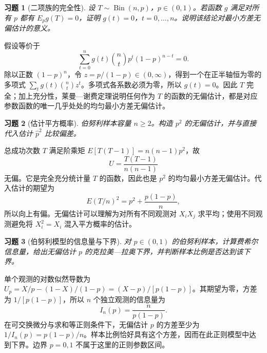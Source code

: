 \documentclass[UTF8,12pt,a4paper,fontset=fandol]{ctexart}
\newtheorem{exercise}{习题}[section]
\begin{document}
\begin{exercise}[二项族的完全性]\label{q:B11.4}
设 $T\sim\operatorname{Bin}(n,p)$，$p\in(0,1)$。若函数 $g$ 满足对所有 $p$ 都有 $E_pg(T)=0$，证明 $g(t)=0$，$t=0,\ldots,n$。说明该结论对最小方差无偏估计的意义。\par{}
\end{exercise}

\begin{solve}\label{a:B11.4}假设等价于\[\sum_{t=0}^ng(t)\binom nt p^t(1-p)^{n-t}=0.\]除以正数 $(1-p)^n$，令 $z=p/(1-p)\in(0,\infty)$，得到一个在正半轴恒为零的多项式 $\sum_tg(t)\binom ntz^t$。多项式各系数必须为零，所以 $g(t)=0$。因此 $T$ 完全；加上充分性，莱曼—谢费定理说明任何作为 $T$ 的函数的无偏估计，都是对应参数函数的唯一几乎处处的均匀最小方差无偏估计。\end{solve}

\begin{exercise}[估计平方概率]\label{q:B11.5}
伯努利样本容量 $n\ge2$。构造 $p^2$ 的无偏估计，并与直接代入估计 $\widehat p^2$ 比较偏差。\par{}
\end{exercise}

\begin{solve}\label{a:B11.5}总成功次数 $T$ 满足阶乘矩 $E[T(T-1)]=n(n-1)p^2$，故\[U=\frac{T(T-1)}{n(n-1)}\]无偏。它是完全充分统计量 $T$ 的函数，因此也是 $p^2$ 的均匀最小方差无偏估计。代入估计的期望为\[E(T/n)^2=p^2+\frac{p(1-p)}n,\]所以向上有偏。无偏估计可以理解为对所有不同观测对 $X_iX_j$ 求平均；使用不同观测避免将 $X_i^2=X_i$ 混入平方概率的估计。\end{solve}

\begin{exercise}[伯努利模型的信息量与下界]\label{q:B11.6}
对 $p\in(0,1)$ 的伯努利样本，计算费希尔信息量，给出无偏估计 $p$ 的克拉美—拉奥下界，并判断样本比例是否达到该下界。\par{}
\end{exercise}

\begin{solve}\label{a:B11.6}单个观测的对数似然导数为 $U_p=X/p-(1-X)/(1-p)=(X-p)/[p(1-p)]$。其期望为零，方差为 $1/[p(1-p)]$，所以 $n$ 个独立观测的信息量为\[I_n(p)=\frac{n}{p(1-p)}.\]在可交换微分与求和等正则条件下，无偏估计 $p$ 的方差至少为 $1/I_n(p)=p(1-p)/n$。样本比例恰好具有这个方差，因而在此正则模型中达到下界。边界 $p=0,1$ 不属于这里的正则参数区间。\end{solve}
\end{document}
